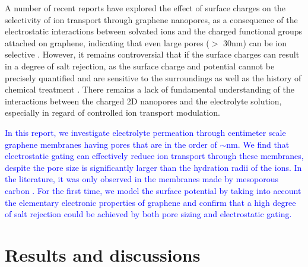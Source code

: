 A number of recent reports have explored the effect of surface charges
on the selectivity of ion transport through graphene nanopores, as a
consequence of the electrostatic interactions between solvated ions
and the charged functional groups attached on graphene, indicating
that even large pores ($>$ 30nm) can be ion selective
\cite{Rollings_2016,Surwade_2014}. However, it remains controversial
that if the surface charges can result in a degree of salt rejection,
as the surface charge and potential cannot be precisely quantified and
are sensitive to the surroundings as well as the history of chemical
treatment \cite{Li_2008}. There remains a lack of fundamental
understanding of the interactions between the charged 2D nanopores and
the electrolyte solution, especially in regard of controlled ion
transport modulation.


\textcolor{blue}{ In this report, we investigate electrolyte
  permeation through centimeter scale graphene membranes having pores
  that are in the order of $\sim{}$\unit[20]{nm}. We find that
  electrostatic gating can effectively reduce ion transport through
  these membranes, despite the pore size is significantly larger than
  the hydration radii of the ions. In the literature, it was only
  observed in the membranes made by mesoporous carbon
  \cite{Surwade_2014}. For the first time, we model the surface
  potential by taking into account the elementary electronic
  properties of graphene and confirm that a high degree of salt
  rejection could be achieved by both pore sizing and electrostatic
  gating. }

\section{Results and discussions}
\label{sec:res}


